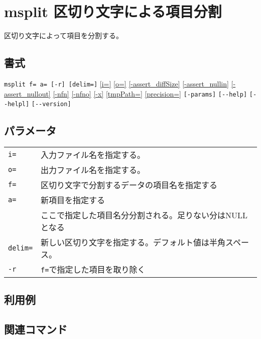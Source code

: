 
%

\section{msplit 区切り文字による項目分割\label{sect:msplit}}
区切り文字によって項目を分割する。

\subsection*{書式}
\verb|msplit f= a= [-r] [delim=]|
\hyperref[sect:option_i]{[i=]}
\hyperref[sect:option_o]{[o=]}
\hyperref[sect:option_assert_diffSize]{[-assert\_diffSize]}
\hyperref[sect:option_assert_nullin]{[-assert\_nullin]}
\hyperref[sect:option_assert_nullout]{[-assert\_nullout]}
\hyperref[sect:option_nfn]{[-nfn]} 
\hyperref[sect:option_nfno]{[-nfno]}  
\hyperref[sect:option_x]{[-x]}
\hyperref[sect:option_option_tmppath]{[tmpPath=]}
\hyperref[sect:option_precision]{[precision=]}
\verb|[-params]|
\verb|[--help]|
\verb|[--helpl]|
\verb|[--version]|\\

\subsection*{パラメータ}
\begin{table}[htbp]
{\small
\begin{tabular}{ll}
\verb|i=|    & 入力ファイル名を指定する。\\
\verb|o=|    & 出力ファイル名を指定する。\\ 
\verb|f=|    & 区切り文字で分割するデータの項目名を指定する\\
\verb|a=|    & 新項目を指定する\\
             & ここで指定した項目名分分割される。足りない分はNULLとなる\\
\verb|delim=| & 新しい区切り文字を指定する。デフォルト値は半角スペース。\\
\verb|-r|    & \verb|f=|で指定した項目を取り除く\\
\end{tabular} 
}
\end{table} 

\subsection*{利用例}

\subsection*{関連コマンド}

%
